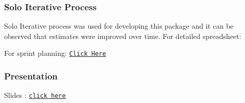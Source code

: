 \subsubsection*{Solo Iterative Process}

Solo Iterative process was used for developing this package and it can be observed that estimates were improved over time. For detailed spreadsheet\+: \href{https://docs.google.com/spreadsheets/d/10tGs0astZB6bFPMXlLJwByrlTDJi1ZNfbLnQGZDo5Xo/edit?usp=sharing}{\tt }

For sprint planning\+: \href{https://docs.google.com/document/d/1hJ8q-_5HhWBHmOfXV9d_nZg0-gOeu8520EBP83TKBbI/edit?usp=sharing}{\tt Click Here}

\subsubsection*{Presentation}

Slides \+: \href{https://docs.google.com/presentation/d/1KM6IbHGB0xqtuu0a0-CgijcBst5EShQxvior-kgVUcg/edit?usp=sharing}{\tt click here} 